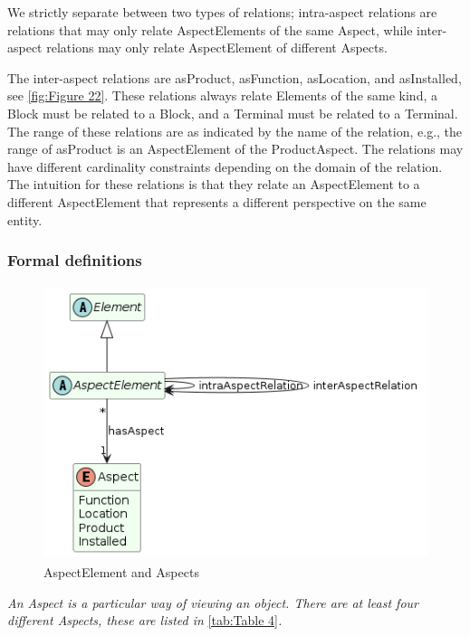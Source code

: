 We strictly separate between two types of relations; intra-aspect relations are relations that may only relate
AspectElements of the same Aspect, while inter-aspect relations may only relate AspectElement of different Aspects.

The inter-aspect relations are asProduct, asFunction, asLocation, and asInstalled, see \autoref{fig:Figure 22}. These relations
always relate Elements of the same kind, a Block must be related to a Block, and a Terminal must be related to a
Terminal. The range of these relations are as indicated by the name of the relation, e.g., the range of asProduct is
an AspectElement of the ProductAspect. The relations may have different cardinality constraints depending on the
domain of the relation. The intuition for these relations is that they relate an AspectElement to a different
AspectElement that represents a different perspective on the same entity.

\subsubsection{Formal definitions}
\begin{figure}[htb]
  \centering
  \includegraphics[width=4.50752in,height=3.15625in]{img/IMFmanual-img040.png}
  \caption{AspectElement and Aspects}
  \label{fig:Figure 21}
\end{figure}

\textit{An Aspect is a particular way of viewing an object. There are at least four different Aspects, these are
  listed in }\autoref{tab:Table 4}\textit{. }

